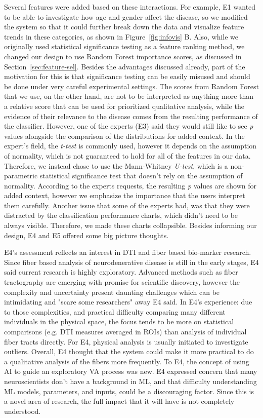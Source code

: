 Several features were added based on these interactions. For example, E1 wanted to be able to investigate how age and gender affect the disease, so we modified the system so that it could further break down the data and visualize feature trends in these categories, as shown in Figure~\ref{fig:infovis} B. Also, while we originally used statistical significance testing as a feature ranking method, we changed our design to use Random Forest importance scores, as discussed in Section~\ref{sec:feature-sel}. Besides the advantages discussed already, part of the motivation for this is that significance testing can be easily misused and should be done under very careful experimental settings. The scores from Random Forest that we use, on the other hand, are not to be interpreted as anything more than a relative score that can be used for prioritized qualitative analysis, while the evidence of their relevance to the disease comes from the resulting performance of the classifier. However, one of the experts (E3) said they would still like to see \textit{p} values alongside the comparison of the distributions for added context. In the expert's field, the \textit{t-test} is commonly used, however it depends on the assumption of normality, which is not guaranteed to hold for all of the features in our data. Therefore, we instead chose to use the Mann-Whitney \textit{U-test}, which is a non-parametric statistical significance test that doesn't rely on the assumption of normality. According to the experts requests, the resulting \textit{p} values are shown for added context, however we emphasize the importance that the users interpret them carefully. Another issue that some of the experts had, was that they were distracted by the classification performance charts, which didn't need to be always visible. Therefore, we made these charts collapsible. Besides informing our design, E4 and E5 offered some big picture thoughts.

E4's assessment reflects an interest in DTI and fiber based bio-marker research. Since fiber based analysis of neurodenerative disease is still in the early stages, E4 said current research is highly exploratory. Advanced methods such as fiber tractography are emerging with promise for scientific discovery, however the complexity and uncertainty present daunting challenges which can be intimidating and "scare some researchers" away E4 said. In E4's experience: due to those complexities, and practical difficulty comparing many different individuals in the physical space, the focus tends to be more on statistical comparisons (e.g. DTI measures averaged in ROIs) than analysis of individual fiber tracts directly. For E4, physical analysis is usually initiated to investigate outliers. Overall, E4 thought that the system could make it more practical to do a qualitative analysis of the fibers more frequently. To E4, the concept of using AI to guide an exploratory VA process was new. E4 expressed concern that many neuroscientists don't have a background in ML, and that difficulty understanding ML models, parameters, and inputs, could be a discouraging factor. Since this is a novel area of research, the full impact that it will have is not completely understood. 


